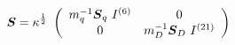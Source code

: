 \begin{equation}
\mbox{\boldmath$S$} = \kappa^{\frac{1}{2}} ~\left(
\begin{array}{cc}
m_q^{-1} {\mbox{\boldmath$S$}}_q~I^{(6)} & 0 \\
0 & m_D^{-1} {\mbox{\boldmath$S$}}_D~I^{(21)}
\end{array} \right)   
\end{equation}

